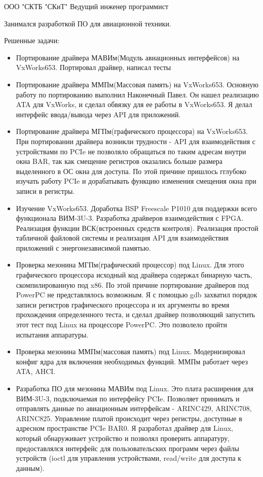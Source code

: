 \jobdetail
{ООО "СКТБ "СКиТ"}
{Ведущий инженер программист}
{Занимался разработкой ПО для авиационной техники.

Решенные задачи:
\begin{itemize}
\item{Портирование драйвера МАВИм(Модуль авиационных интерфейсов) на VxWorks653. Портировал драйвер, написал тесты}
\item{Портирование драйвера ММПм(Массовая память) на VxWorks653. Основную работу по портированию выполнил Наконечный Павел. Он нашел реализацию ATA для VxWorks, и сделал обвязку для ее работы в VxWorks653. Я делал интерфейс ввода/вывода через API для приложений.}
\item{Портирование драйвера МГПм(графического процессора) на VxWorks653. При портировании драйвера возникли трудности - API для взаимодействия с устройствами по PCIe не позволяло обращаться по таким адресам внутри окна BAR, так как смещение регистров оказались больше размера выделенного в ОС окна для доступа. По этой причине пришлось гглубоко изучать работу PCIe и дорабатывать функцию изменения смещения окна при записи в регистры.}
\item{Изучение VxWorks653. Доработка BSP Freescale P1010 для поддержки всего функционала ВИМ-3U-3. Разработка драйверов взаимодействия с FPGA. Реализация функции ВСК(встроенных средств контроля). Реализация простой табличной файловой системы и реализация API для взаимодействия приложений с энергонезависимой памятью.}
\item{Проверка мезонина МГПм(графический процессор) под Linux. Для этого графического процессора исходный код драйвера содержал бинарную часть, скомпилированную под x86. По этой причине портирование драйверов под PowerPC не представлялось возможным. Я с помощью gdb захватил порядок записи регистров графического процессора и их аргументы во время прохождения определенного теста, и сделал драйвер позволяющий запустить этот тест под Linux на процессоре PowerPC. Это позволело пройти испытания аппаратуры.}
\item{Проверка мезонина ММПм(массовая память) под Linux. Модернизировал конфиг ядра для включения необходимых функций. ММПм работает через ATA, AHCI.}
\item{Разработка ПО для мезонина МАВИм под Linux. Это плата расширения для ВИМ-3U-3, подключаемая по интерфейсу PCIe. Позволяет принимать и отправлять данные по авиационным интерфейсам - ARINC429, ARINC708, ARINC825. Управление платой происходит через регистры, доступные в адресном пространстве PCIe BAR0. Я разработал драйвер для Linux, который обнаруживает устройство и позволял проверить аппаратуру, предоставлялся интерфейс для пользовательских программ через файлы устройств (ioctl для управления устройствами, read/write для доступа к данным).}

\end{itemize}}
